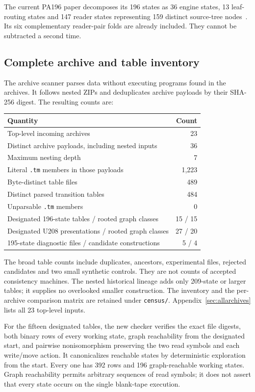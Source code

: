 \documentclass[11pt,letterpaper]{article}
\newcommand{\file}[1]{\texttt{\nolinkurl{#1}}}
\begin{document}
The current PA196 paper decomposes its 196 states as 36 engine states,
13 leaf-routing states and 147 reader states representing 159 distinct
source-tree nodes~\cite{pa196paper}. Its six complementary reader-pair
folds are already included. They cannot be subtracted a second time.

\subsection{Complete archive and table inventory}

The archive scanner parses data without executing programs found in the
archives. It follows nested ZIPs and deduplicates archive payloads by their
SHA-256 digest. The resulting counts are:

\begin{center}
\begin{tabular}{@{}lr@{}}
\toprule
Quantity & Count\\
\midrule
Top-level incoming archives & 23\\
Distinct archive payloads, including nested inputs & 36\\
Maximum nesting depth & 7\\
Literal \file{.tm} members in those payloads & 1,223\\
Byte-distinct table files & 489\\
Distinct parsed transition tables & 484\\
Unparsable \file{.tm} members & 0\\
Designated 196-state tables / rooted graph classes & 15 / 15\\
Designated U208 presentations / rooted graph classes & 27 / 20\\
195-state diagnostic files / candidate constructions & 5 / 4\\
\bottomrule
\end{tabular}
\end{center}

The broad table counts include duplicates, ancestors, experimental files,
rejected candidates and two small synthetic controls. They are not counts of
accepted consistency machines. The nested historical lineage adds only
209-state or larger tables; it supplies no overlooked smaller construction.
The inventory and the per-archive comparison matrix are retained under
\file{census/}. Appendix~\ref{sec:allarchives} lists all 23 top-level inputs.

For the fifteen designated tables, the new checker verifies the exact file
digests, both binary rows of every working state, graph reachability from
the designated start, and pairwise nonisomorphism preserving the two read
symbols and each write/move action. It canonicalizes reachable states by
deterministic exploration from the start. Every one has 392 rows and 196
graph-reachable working states. Graph reachability permits arbitrary sequences
of read symbols; it does not assert that every state occurs on the single
blank-tape execution.
\end{document}
